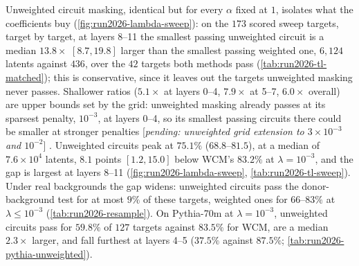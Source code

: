 \documentclass[10pt]{article}
\newif\ifexternal
\DeclareRobustCommand{\pending}[1]{%
  \ifexternal
    \ifvmode\textcolor{black!55}{[to be added]}\else\unskip\fi
  \else
    \textcolor{red!70!black}{[\textit{pending: #1}]}%
  \fi}
\begin{document}
Unweighted circuit masking, identical but for every $\alpha$ fixed at $1$, isolates what the coefficients buy (\cref{fig:run2026-lambda-sweep}): on the $173$ scored sweep targets, target by target, at layers 8--11 the smallest passing unweighted circuit is a median $13.8\times$ $[8.7, 19.8]$ larger than the smallest passing weighted one, $6{,}124$ latents against $436$, over the $42$ targets both methods pass (\cref{tab:run2026-tl-matched}); this is conservative, since it leaves out the targets unweighted masking never passes.
Shallower ratios ($5.1\times$ at layers 0--4, $7.9\times$ at 5--7, $6.0\times$ overall) are upper bounds set by the grid: unweighted masking already passes at its sparsest penalty, $10^{-3}$, at layers 0--4, so its smallest passing circuits there could be smaller at stronger penalties \pending{unweighted grid extension to $3 \times 10^{-3}$ and $10^{-2}$}.
Unweighted circuits peak at $75.1\%$ ($68.8$--$81.5$), at a median of $7.6 \times 10^{4}$ latents, $8.1$ points $[1.2, 15.0]$ below WCM's $83.2\%$ at $\lambda = 10^{-3}$, and the gap is largest at layers 8--11 (\cref{fig:run2026-lambda-sweep}, \cref{tab:run2026-tl-sweep}).
Under real backgrounds the gap widens: unweighted circuits pass the donor-background test for at most $9\%$ of these targets, weighted ones for $66$--$83\%$ at $\lambda \le 10^{-3}$ (\cref{tab:run2026-resample}).
On Pythia-70m at $\lambda = 10^{-3}$, unweighted circuits pass for $59.8\%$ of $127$ targets against $83.5\%$ for WCM, are a median $2.3\times$ larger, and fall furthest at layers 4--5 ($37.5\%$ against $87.5\%$; \cref{tab:run2026-pythia-unweighted}).
\end{document}
